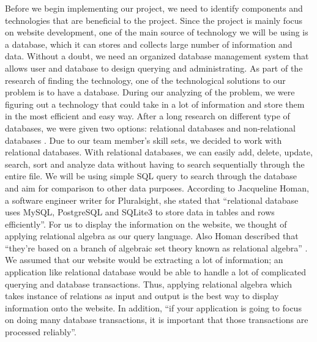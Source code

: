 \documentclass[letterpaper,10pt, draftclsnofoot,onecolumn]{IEEEtran}
\begin{document}
{{\color{black}\normalsize\noindent
{Before we begin implementing our project, we need to identify components and technologies that are beneficial to the project. 
Since the project is mainly focus on website development, one of the main source of technology we will be using is a database, which it can stores and collects large number of information and data.
Without a doubt, we need an organized database management system that allows user and database to design querying and administrating.
As part of the research of finding the technology, one of the technological solutions to our problem is to have a database. 
During our analyzing of the problem, we were figuring out a technology that could take in a lot of information and store them in the most efficient and easy way. 
After a long research on different type of databases, we were given two options: relational databases and non-relational databases \cite{IEEEexample:article}. 
Due to our team member’s skill sets, we decided to work with relational databases. 
With relational databases, we can easily add, delete, update, search, sort and analyze data without having to search sequentially through the entire file.
We will be using simple SQL query to search through the database and aim for comparison to other data purposes. 
According to Jacqueline Homan, a software engineer writer for Pluralsight, she stated that “relational database uses MySQL, PostgreSQL and SQLite3 to store data in tables and rows efficiently”\cite{IEEEexample:article}. 
For us to display the information on the website, we thought of applying relational algebra as our query language.
Also Homan described that “they’re based on a branch of algebraic set theory known as relational algebra” \cite{IEEEexample:article}. 
We assumed that our website would be extracting a lot of information; an application like relational database would be able to handle a lot of complicated querying and database transactions. 
Thus, applying relational algebra which takes instance of relations as input and output is the best way to display information onto the website. 
In addition, “if your application is going to focus on doing many database transactions, it is important that those transactions are processed reliably”. \cite{IEEEexample:article} 
}

}}
\end{document}
